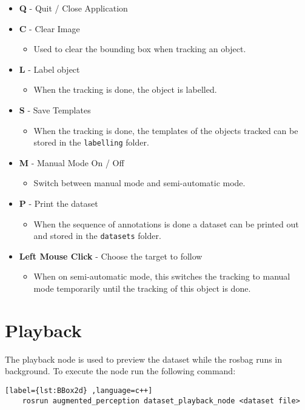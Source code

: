 \begin{itemize}
	\item \textbf{Q} - Quit / Close Application
	\item \textbf{C} - Clear Image
	\begin{itemize}
		\item Used to clear the bounding box when tracking an object.
	\end{itemize}
	\item \textbf{L} - Label object
	\begin{itemize}
		\item When the tracking is done, the object is labelled.
	\end{itemize}
	\item \textbf{S} - Save Templates
	\begin{itemize}
		\item When the tracking is done, the templates of the objects tracked can be stored in the \texttt{labelling} folder.
	\end{itemize}
	\item \textbf{M} - Manual Mode On / Off
	\begin{itemize}
		\item Switch between manual mode and semi-automatic mode.
	\end{itemize}
	\item \textbf{P} - Print the dataset
	\begin{itemize}
		\item When the sequence of annotations is done a dataset can be printed out and stored in the \texttt{datasets} folder.
	\end{itemize}
	\item \textbf{Left Mouse Click} - Choose the target to follow
	\begin{itemize}
		\item When on semi-automatic mode, this switches the tracking to manual mode temporarily until the tracking of this object is done.
	\end{itemize}
\end{itemize}


\section{Playback}

The playback node is used to preview the dataset while the rosbag runs in background. To execute the node run the following command: 

\begin{center}
	\begin{lstlisting}[label={lst:BBox2d} ,language=c++]
	rosrun augmented_perception dataset_playback_node <dataset file>\end{lstlisting}
\end{center}


